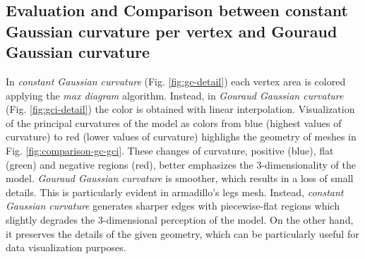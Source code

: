 \subsection{Evaluation and Comparison between constant Gaussian curvature per vertex and Gouraud Gaussian curvature}
In \textit{constant Gaussian curvature} (Fig. \ref{fig:gc-detail}) each vertex area is colored applying the \textit{max diagram} algorithm. Instead, in \textit{Gouraud Gaussian curvature} (Fig. \ref{fig:gci-detail}) the color is obtained with linear interpolation.
Visualization of the principal curvatures of the model as colors from blue (highest values of curvature) to red (lower values of curvature) highlighs the geometry of meshes in Fig. \ref{fig:comparison-gc-gci}.
These changes of curvature, positive (blue), flat (green) and negative regions (red), better emphasizes the 3-dimensionality of the model.
\textit{Gouraud Gaussian curvature} is smoother, which results in a loss of small details. This is particularly evident in armadillo's legs mesh. Instead, \textit{constant Gaussian curvature} generates sharper edges with piecewise-flat regions which slightly degrades the 3-dimensional perception of the model.
On the other hand, it preserves the details of the given geometry, which can be particularly useful for data visualization purposes.

